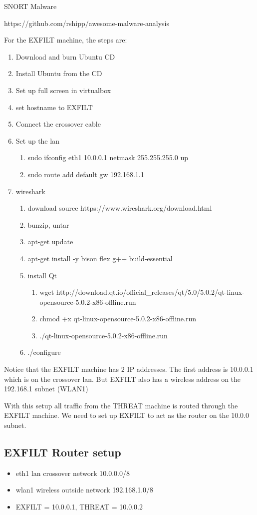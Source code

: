 SNORT Malware

https://github.com/rshipp/awesome-malware-analysis

For the EXFILT machine, the steps are:
\begin{enumerate}
\item Download and burn Ubuntu CD
\item Install Ubuntu from the CD
\item Set up full screen in virtualbox
\item set hostname to EXFILT
\item Connect the crossover cable
\item Set up the lan
\begin{enumerate}
\item sudo ifconfig eth1 10.0.0.1 netmask 255.255.255.0 up
\item sudo route add default gw 192.168.1.1
\end{enumerate}
\item wireshark
\begin{enumerate}
\item download source https://www.wireshark.org/download.html
\item bunzip, untar
\item apt-get update
\item apt-get install -y bison flex g++ build-essential
\item install Qt
\begin{enumerate}
\item wget http://download.qt.io/official\_releases/qt/5.0/5.0.2/qt-linux-opensource-5.0.2-x86-offline.run
\item chmod +x qt-linux-opensource-5.0.2-x86-offline.run
\item ./qt-linux-opensource-5.0.2-x86-offline.run
\end{enumerate}
\item ./configure
\end{enumerate}
\end{enumerate}
Notice that the EXFILT machine has 2 IP addresses. The first
address is 10.0.0.1 which is on the crossover lan. But EXFILT
also has a wireless address on the 192.168.1 subnet (WLAN1)

With this setup all traffic from the THREAT machine is routed
through the EXFILT machine. We need to set up EXFILT to act
as the router on the 10.0.0 subnet. 

\subsection{EXFILT Router setup}
\begin{itemize}
\item eth1 lan crossover network 10.0.0.0/8
\item wlan1 wireless outside network 192.168.1.0/8
\item EXFILT = 10.0.0.1, THREAT = 10.0.0.2
\end{itemize}

